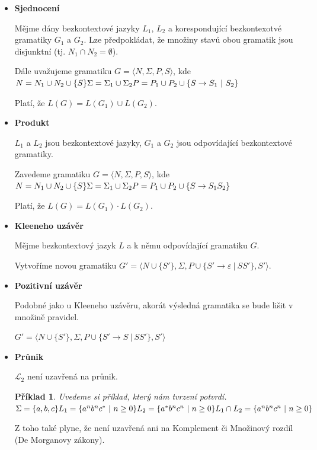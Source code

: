 \documentclass[10pt, a4paper, titlepage]{article}
\theoremstyle{note}
\newtheorem{priklad}{\textbf{Příklad}}
\begin{document}
\begin{itemize}
\item
\textbf{Sjednocení}

Mějme dány bezkontextové jazyky $L_1$, $L_2$ a korespondující bezkontexotvé gramatiky $G_1$ a $G_2$. Lze předpokládat, že množiny stavů obou gramatik jsou disjunktní (tj. $N_1 \cap N_2 = \emptyset$).

Dále uvažujeme gramatiku $G = \langle N,\Sigma,P,S \rangle$, kde \\
$N=N_1 \cup N_2 \cup \lbrace S \rbrace \\
\Sigma = \Sigma_1 \cup \Sigma_2 \\
P = P_1 \cup P_2 \cup \lbrace S \rightarrow S_1\ |\ S_2 \rbrace$

Platí, že $L(G)=L(G_1) \cup L(G_2)$.

\item
\textbf{Produkt}

$L_1$ a $L_2$ jsou bezkontextové jazyky, $G_1$ a $G_2$ jsou odpovídající bezkontextové gramatiky.

Zavedeme gramatiku $G = \langle N,\Sigma,P,S \rangle$, kde \\
$N=N_1 \cup N_2 \cup \lbrace S \rbrace \\
\Sigma = \Sigma_1 \cup \Sigma_2 \\
P = P_1 \cup P_2 \cup \lbrace S \rightarrow S_1S_2 \rbrace$

Platí, že $L(G) = L(G_1) \cdot L(G_2)$.

\item
\textbf{Kleeneho uzávěr}

Mějme bezkontextový jazyk $L$ a k němu odpovídající gramatiku $G$.

Vytvoříme novou gramatiku $G' = \langle N \cup \lbrace S' \rbrace,\Sigma,P \cup \lbrace S' \rightarrow \varepsilon\ |\ SS'\rbrace,S' \rangle$.

\item
\textbf{Pozitivní uzávěr}

Podobné jako u Kleeneho uzávěru, akorát výsledná gramatika se bude lišit v množině pravidel.

$G' = \langle N \cup \lbrace S' \rbrace,\Sigma,P \cup \lbrace S' \rightarrow S\ |\ SS'\rbrace,S' \rangle$

\item
\textbf{Průnik}

$\mathcal{L}_2$ není uzavřená na průnik.

\begin{priklad}
Uvedeme si příklad, který nám tvrzení potvrdí.\\
$\Sigma = \lbrace a,b,c \rbrace \\
L_1 = \lbrace a^nb^nc^*\ |\ n \ge 0 \rbrace \\
L_2 = \lbrace a^*b^nc^n\ |\ n \ge 0 \rbrace \\
\\
L_1 \cap L_2 = \lbrace a^nb^nc^n\ |\ n \ge 0 \rbrace$
\end{priklad}
Z toho také plyne, že není uzavřená ani na Komplement či Množinový rozdíl (De Morganovy zákony).
\end{itemize}
\end{document}

